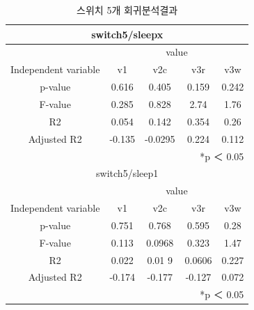 \documentclass[11pt
  , a4paper
  , article
  , oneside
]{memoir}
\begin{document}
\begin{table}[h!]
\begin{center}
\begin{tabular}{c|c||c||c||c}\hline
\multicolumn{5}{c}{switch5/sleepx}\\ \hline\hline
\multicolumn{1}{c|}{}& \multicolumn{4}{c}{value}\\
\cline{1-5}
Independent variable & v1 & v2c & v3r & v3w      \\ \hline\hline
p-value & 0.616 & 0.405& 0.159 & 0.242\\ 
F-value & 0.285 & 0.828& 2.74 & 1.76\\ 
R2 & 0.054 & 0.142& 0.354 & 0.26\\ 
Adjusted R2 & -0.135 & -0.0295& 0.224 & 0.112\\ \hline\hline
\multicolumn{5}{r}{*p ＜ 0.05} \\ \hline \hline
\multicolumn{5}{c}{switch5/sleep1}\\ \hline\hline
\multicolumn{1}{c|}{}& \multicolumn{4}{c}{value}\\
\cline{1-5}
Independent variable & v1 & v2c & v3r & v3w      \\ \hline\hline
p-value & 0.751 & 0.768 & 0.595 & 0.28\\ 
F-value & 0.113 & 0.0968 & 0.323 & 1.47\\ 
R2 & 0.022 & 0.01 9& 0.0606 & 0.227\\ 
Adjusted R2 & -0.174 & -0.177 & -0.127 & 0.072\\ \hline

\multicolumn{5}{r}{*p ＜ 0.05} \\ \hline\hline
\end{tabular}
\caption{  스위치 5개 회귀분석결과 }
\end{center}
\end{table} 





\clearpage


\end{document}
